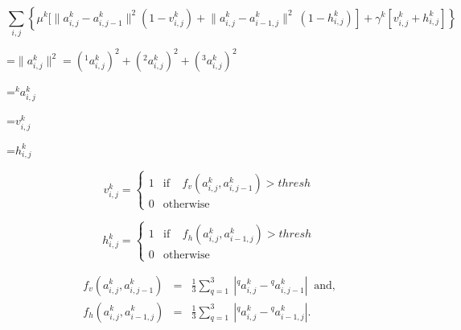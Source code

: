 {\newpage
\clearpage
\samepage \begin{equation}\sum_{i,j}  \left\{  \mu^k  [   \|a^k_{i,j}-a^k_{i,j-1} \|^2
(1-v^k_{i,j})   \right .
+ \left .  \|a^k_{i,j}-a^k_{i-1,j} \|^2 \ 
(1-h^k_{i,j})     
\right ]
+  \left.  \gamma^k  [  v^k_{i,j} + h^k_{i,j}  ]  \right\}
\label{eq:sum_energy}
\end{equation}
}

{\newpage
\clearpage
\samepage \setbox\sizebox=\hbox{$
\|a^k_{i,j} \|^2 = 
(^1a^k_{i,j})^2+(^2a^k_{i,j})^2+(^3a^k_{i,j})^2 
$}\box\sizebox
}

{\newpage
\clearpage
\samepage \setbox\sizebox=\hbox{$^ka^k_{i,j}$}\box\sizebox
}

{\newpage
\clearpage
\samepage \setbox\sizebox=\hbox{$v^k_{i,j}$}\box\sizebox
}

{\newpage
\clearpage
\samepage \setbox\sizebox=\hbox{$h^k_{i,j}$}\box\sizebox
}

{\newpage
\clearpage
\samepage \begin{displaymath}v^k_{i,j}= \left \{ \begin{array}{cl}
                    1& \mbox{if} \;\;\;\; 
f_v(a_{i,j}^k, a_{i,j-1}^k) > thresh  \\ 
                    0 & \mbox{otherwise}
                    \end{array}
                 \right .
\end{displaymath}
}

{\newpage
\clearpage
\samepage \begin{displaymath}h^k_{i,j}= \left \{ \begin{array}{cl}
                    1& \mbox{if} \;\;\;\; 
f_h(a_{i,j}^k, a_{i-1,j}^k) > thresh  \\ 
                    0 & \mbox{otherwise}
                    \end{array}
                 \right .
\end{displaymath}
}

{\newpage
\clearpage
\samepage \begin{eqnarray}f_v(a_{i,j}^k, a_{i,j-1}^k)&=&\frac{1}{3} 
\sum_{q=1}^{3}\ \left | ^qa_{i,j}^k - {^qa_{i,j-1}^k} \right |  
\;\; \mbox{and,} \nonumber
  \\ 
f_h(a_{i,j}^k, a_{i-1,j}^k)&=&\frac{1}{3} 
\sum_{q=1}^{3}\ \left | ^qa_{i,j}^k - {^qa_{i-1,j}^k} \right |.  
\label{eq:sum_line}  
\end{eqnarray}
}

